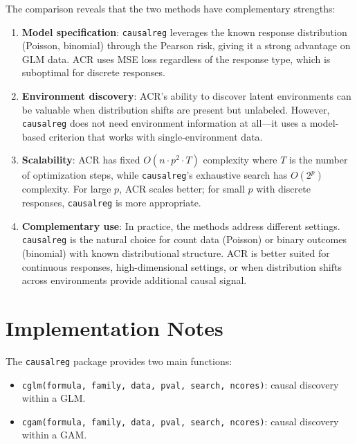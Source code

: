 \documentclass[11pt,a4paper]{article}
\begin{document}
The comparison reveals that the two methods have complementary strengths:

\begin{enumerate}
    \item \textbf{Model specification}: \texttt{causalreg} leverages the known response distribution (Poisson, binomial) through the Pearson risk, giving it a strong advantage on GLM data. ACR uses MSE loss regardless of the response type, which is suboptimal for discrete responses.

    \item \textbf{Environment discovery}: ACR's ability to discover latent environments can be valuable when distribution shifts are present but unlabeled. However, \texttt{causalreg} does not need environment information at all---it uses a model-based criterion that works with single-environment data.

    \item \textbf{Scalability}: ACR has fixed $O(n \cdot p^2 \cdot T)$ complexity where $T$ is the number of optimization steps, while \texttt{causalreg}'s exhaustive search has $O(2^p)$ complexity. For large $p$, ACR scales better; for small $p$ with discrete responses, \texttt{causalreg} is more appropriate.

    \item \textbf{Complementary use}: In practice, the methods address different settings. \texttt{causalreg} is the natural choice for count data (Poisson) or binary outcomes (binomial) with known distributional structure. ACR is better suited for continuous responses, high-dimensional settings, or when distribution shifts across environments provide additional causal signal.
\end{enumerate}

\section{Implementation Notes}

The \texttt{causalreg} package provides two main functions:

\begin{itemize}
    \item \texttt{cglm(formula, family, data, pval, search, ncores)}: causal discovery within a GLM.
    \item \texttt{cgam(formula, family, data, pval, search, ncores)}: causal discovery within a GAM.
\end{itemize}
\end{document}
